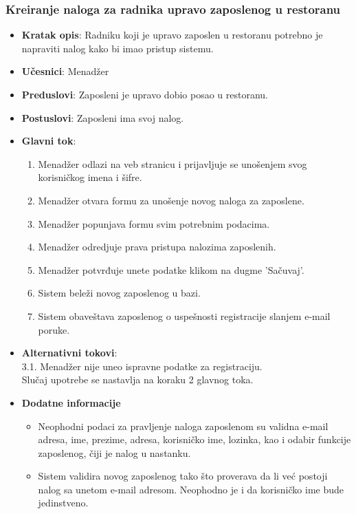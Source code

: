  \subsubsection{Kreiranje naloga za radnika upravo zaposlenog u restoranu}
\begin{itemize}
    \item \textbf{Kratak opis}:
   Radniku koji je upravo zaposlen u restoranu potrebno je napraviti nalog kako bi imao pristup sistemu.
    \item \textbf{Učesnici}:
    Menadžer
    \item \textbf{Preduslovi}:
    Zaposleni je upravo dobio posao u restoranu.
    \item \textbf{Postuslovi}:
    Zaposleni ima svoj nalog. 
    \item \textbf{Glavni tok}:
   \begin{enumerate}
        \item Menadžer odlazi na veb stranicu i prijavljuje se unošenjem svog korisničkog imena i šifre.
        \item Menadžer otvara formu za unošenje novog naloga za zaposlene.
        \item Menadžer popunjava formu svim potrebnim podacima.
        \item Menadžer odredjuje prava pristupa nalozima zaposlenih.
        \item Menadžer potvrđuje unete podatke klikom na dugme 'Sačuvaj'.
        \item Sistem beleži novog zaposlenog u bazi.
        \item Sistem obaveštava zaposlenog o uspešnosti registracije slanjem e-mail poruke.
\end{enumerate}
\end{itemize}
\begin {itemize}
\item \textbf {Alternativni tokovi}:\\
 3.1. Menadžer nije uneo ispravne podatke za registraciju.\\
 Slučaj upotrebe se nastavlja na koraku 2 glavnog toka.
 \end{itemize}
 \begin{itemize} 
     \item \textbf{Dodatne informacije}
 \begin{itemize}
     \item Neophodni podaci za pravljenje naloga zaposlenom su validna e-mail adresa, ime, prezime, adresa, korisničko ime, lozinka, kao i odabir funkcije zaposlenog, čiji je nalog u nastanku.
    \item Sistem validira novog zaposlenog tako što proverava da li već postoji nalog sa unetom e-mail adresom. Neophodno je i da korisničko ime bude jedinstveno.
 \end{itemize}
 \end{itemize}

